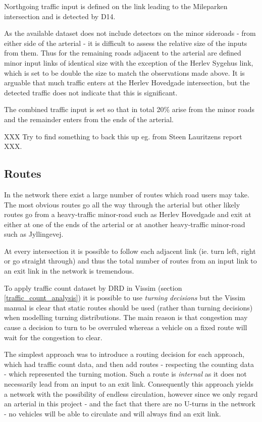 Northgoing traffic input is defined on the link leading to the Mileparken intersection and is detected by D14. 

As the available dataset does not include detectors on the minor sideroads - from either side of the arterial - it is difficult to assess the relative size of the inputs from them. Thus for the remaining roads adjacent to the arterial are defined minor input links of identical size with the exception of the Herlev Sygehus link, which is set to be double the size to match the observations made above.
It is arguable that much traffic enters at the Herlev Hovedgade intersection, but the detected traffic does not indicate that this is significant.

The combined traffic input is set so that in total 20\% arise from the minor roads and the remainder enters from the ends of the arterial. 

XXX Try to find something to back this up eg. from Steen Lauritzens report XXX.

\subsection{Routes}
\label{routefractions}
In the network there exist a large number of routes which road users may take. The most obvious routes go all the way through the arterial but other likely routes go from a heavy-traffic minor-road such as Herlev Hovedgade and exit at either at one of the ends of the arterial or at another heavy-traffic minor-road such as Jyllingevej.

At every intersection it is possible to follow each adjacent link (ie. turn left, right or go straight through) and thus the total number of routes from an input link to an exit link in the network is tremendous.

To apply traffic count dataset by DRD in Vissim (section \ref{traffic_count_analysis}) it is possible to use \textit{turning decisions} but the Vissim manual is clear that static routes should be used (rather than turning decisions) when modelling turning distributions. The main reason is that congestion may cause a decision to turn to be overruled whereas a vehicle on a fixed route will wait for the congestion to clear. 

The simplest approach was to introduce a routing decision for each approach, which had traffic count data, and then add routes - respecting the counting data - which represented the turning motion. Such a route is \textit{internal} as it does not necessarily lead from an input to an exit link. Consequently this approach yields a network with the possibility of endless circulation, however since we only regard an arterial in this project - and the fact that there are no U-turns in the network - no vehicles will be able to circulate and will always find an exit link.

